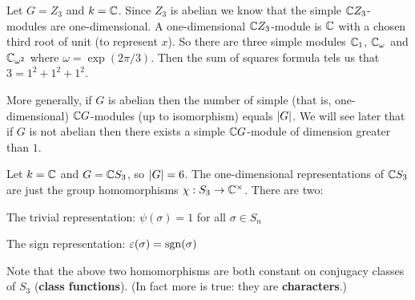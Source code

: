\begin{exam}
	\leavevmode
	\begin{enum}
		\io
		Let $G=Z_3$ and $k=\mathbb{C}$.
		Since $Z_3$ is abelian we know that the simple $\mathbb{C} Z_3$-modules are one-dimensional.
		A one-dimensional $\mathbb{C} Z_3$-module is $\mathbb{C}$ with a chosen third root of unit (to represent $x$).
		So there are three simple modules $\mathbb{C}_1$, $\mathbb{C}_\omega$ and $\mathbb{C}_{\omega^2}$ where $\omega=\exp(2\pi/3)$.
		Then the sum of squares formula tels us that $3=1^2+1^2+1^2$.
		
		More generally, if $G$ is abelian then the number of simple (that is, one-dimensional) $\mathbb{C} G$-modules (up to isomorphism) equals $\left\lvert G \right\rvert$.
		We will see later that if $G$ is not abelian then there exists a simple $\mathbb{C} G$-module of dimension greater than $1$.
		
		\io
		Let $k=\mathbb{C}$ and $G=\mathbb{C} S_3$, so $\left\lvert G \right\rvert=6$.
		The one-dimensional representations of $\mathbb{C} S_3$ are just the group homomorphisms $\chi: S_3 \to \mathbb{C}^\times$.
		There are two:
		\begin{enum}
			\io
			The trivial representation: $\psi(\sigma)=1$ for all $\sigma\in S_n$
			
			\io
			The sign representation: $\varepsilon(\sigma)=\operatorname{sgn}(\sigma)$
		\end{enum}
		Note that the above two homomorphisms are both constant on conjugacy classes of $S_3$ (\textbf{class functions}).
		(In fact more is true: they are \textbf{characters}.)
		

\end{enum}
\end{exam}
